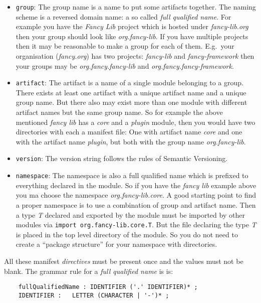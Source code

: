 \documentclass[a4paper,12pt]{report}
\begin{document}
\begin{itemize}
    \item \texttt{group}: The group name is a name to put some artifacts together. The naming scheme is a reversed domain name: a so called \textit{full qualified name}. For example you have the \textit{Fancy Lib} project which is hosted under \textit{fancy-lib.org} then your group should look like \textit{org.fancy-lib}. If you have multiple projects then it may be reasonable to make a group for each of them. E.g.\ your organisation (\textit{fancy.org}) has two projects: \textit{fancy-lib} and \textit{fancy-framework} then your groups may be \textit{org.fancy.fancy-lib} and \textit{org.fancy.fancy-framework}.
    \item \texttt{artifact}: The artifact is a name of a single module belonging to a group. There exists at least one artifact with a unique artifact name and a unique group name. But there also may exist more than one module with different artifact names but the same group name. So for example the above mentioned \textit{fancy lib} has a \textit{core} and a \textit{plugin} module, then you would have two directories with each a manifest file: One with artifact name \textit{core} and one with the artifact name \textit{plugin}, but both with the group name \textit{org.fancy-lib}.
    \item \texttt{version}: The version string follows the rules of Semantic Versioning\cite{semver}.
    \item \texttt{namespace}: The namespace is also a full qualified name which is prefixed to everything declared in the module. So if you have the \textit{fancy lib} example above you ma choose the namespace \textit{org.fancy-lib.core}. A good starting point to find a proper namespace is to use a combination of group and artifact name. Then a type \textit{T} declared and exported by the module must be imported by other modules via \texttt{import org.fancy-lib.core.T}. But the file declaring the type \textit{T} is placed in the top level directory of the module. So you do not need to create a ``package structure'' for your namespace with directories. 
\end{itemize}

All these manifest \textit{directives} must be present once and the values must not be blank. The grammar rule for a \textit{full qualified name} is is: 

\begin{lstlisting}
    fullQualifiedName : IDENTIFIER ('.' IDENTIFIER)* ;    
    IDENTIFIER :   LETTER (CHARACTER | '-')* ;
\end{lstlisting}
\end{document}
